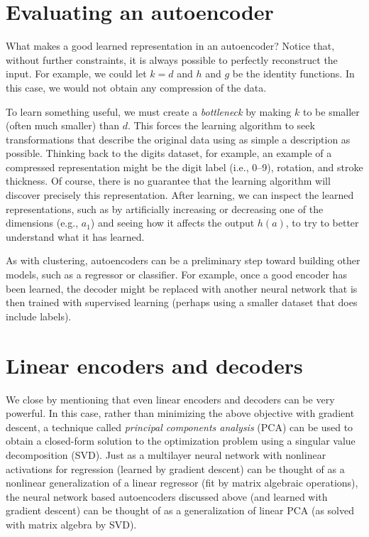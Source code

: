 \section{Evaluating an autoencoder}

What makes a good learned representation in an autoencoder? Notice
that, without further constraints, it is always possible to perfectly
reconstruct the input. For example, we could let $k=d$ and $h$ and $g$
be the identity functions. In this case, we would not obtain any
compression of the data.

To learn something useful, we must create a
\textit{bottleneck} by making $k$ to be smaller (often much smaller)
than $d$. This forces the learning algorithm to seek transformations
that describe the original data using as simple a description as
possible. Thinking back to the digits dataset, for example, an example
of a compressed representation might be the digit label (i.e., 0--9),
rotation, and stroke thickness. Of course, there is no guarantee that
the learning algorithm will discover precisely this
representation. After learning, we can inspect the learned
representations, such as by artificially increasing or decreasing one
of the dimensions (e.g., $a_1$) and seeing how it affects the output
$h(a)$, to try to better understand what it has learned.

As with clustering, autoencoders can be a preliminary step toward
building other models, such as a regressor or classifier. For example,
once a good encoder has been learned, the decoder might be replaced
with another neural network that is then trained with supervised learning
(perhaps using a smaller dataset that does include labels).

\section{Linear encoders and decoders}

We close by mentioning that even linear encoders and decoders can be
very powerful. In this case, rather than minimizing the above
objective with gradient descent, a technique called \textit{principal
  components analysis} (PCA) can be used to obtain a closed-form
solution to the optimization problem using a singular value
decomposition (SVD).  Just as a multilayer neural network with
nonlinear activations for regression (learned by gradient descent) can
be thought of as a nonlinear generalization of a linear regressor (fit
by matrix algebraic operations), the neural network based autoencoders
discussed above (and learned with gradient descent) can be thought of
as a generalization of linear PCA (as solved with matrix algebra by
SVD).

